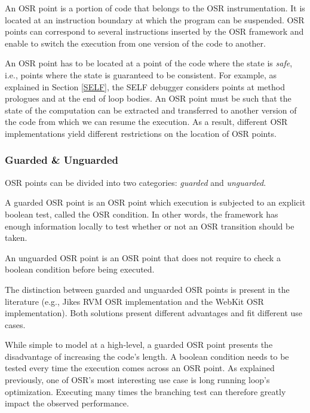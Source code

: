 \begin{definition}\label{OSRPointDefinition}
An OSR point is a portion of code that belongs to the OSR instrumentation.
It is located at an instruction boundary at which the program can be suspended.
OSR points can correspond to several instructions inserted by the OSR framework and enable to switch the execution from one version of the code to another.
\end{definition}

An OSR point has to be located at a point of the code where the state is \textit{safe}, i.e., points where the state is guaranteed to be consistent.
For example, as explained in Section \ref{SELF}, the SELF debugger\cite{holzle1992debugging} considers points at method prologues and at the end of loop bodies.
An OSR point must be such that the state of the computation can be extracted and transferred to another version of the code from which we can resume the execution.
As a result, different OSR implementations yield different restrictions on the location of OSR points.\\

\subsubsection{Guarded \& Unguarded}

OSR points can be divided into two categories: \textit{guarded} and \textit{unguarded}.
\begin{definition}
A guarded OSR point is an OSR point which execution is subjected to an explicit boolean test, called the OSR condition.
In other words, the framework has enough information locally to test whether or not an OSR transition should be taken.
\end{definition}
\begin{definition}
An unguarded OSR point is an OSR point that does not require to check a boolean condition before being executed. 
\end{definition}
The distinction between guarded and unguarded OSR points is present in the literature (e.g., Jikes RVM OSR implementation\cite{fink2003design, soman2006efficient} and the WebKit OSR implementation\cite{WebKitURL}).
Both solutions present different advantages and fit different use cases.

While simple to model at a high-level, a guarded OSR point presents the disadvantage of increasing the code's length. 
A boolean condition needs to be tested every time the execution comes across an OSR point.
As explained previously, one of OSR's most interesting use case is long running loop's optimization.
Executing many times the branching test can therefore greatly impact the observed performance.

